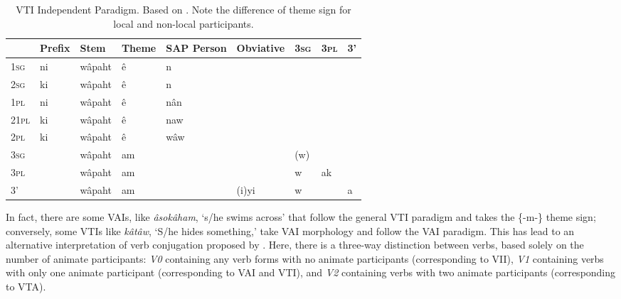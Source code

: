 \begin{table}[h]
  \centering
\begin{tabular}{lllllllll}
    \toprule
     & Prefix & Stem   & Theme & SAP Person & Obviative & 3\textsc{sg} & 3\textsc{pl} & 3' \\
    \midrule
1\textsc{sg}    & ni     & wâpaht & ê     & n          &           &            &            &    \\
2\textsc{sg}    & ki     & wâpaht & ê     & n          &           &            &            &    \\
1\textsc{pl}  & ni     & wâpaht & ê     & nân        &           &            &            &    \\
21\textsc{pl} & ki     & wâpaht & ê     & naw        &           &            &            &    \\
2\textsc{pl}  & ki     & wâpaht & ê     & wâw        &           &            &            &    \\
3\textsc{sg}    &        & wâpaht & am    &            &           & (w)        &            &    \\
3\textsc{pl}  &        & wâpaht & am    &            &           & w          & ak         &    \\
3'   &        & wâpaht & am    &            & (i)yi       & w          &            & a    \\
    \bottomrule
  \end{tabular}
  \caption{
    VTI Independent Paradigm. Based on \citet[417]{Wolvengrey2011}. Note the difference of theme sign for local and non-local participants. \label{tab:vtiindpara}
  }
\end{table}



In fact, there are some VAIs, like \textit{âsokâham}, `s/he swims across' that follow the general VTI paradigm and takes the \{-m-\} theme sign; conversely, some VTIs like \textit{kâtâw}, `S/he hides something,' take VAI morphology and follow the VAI paradigm. This has lead to an alternative interpretation of verb conjugation proposed by \citet{Wolvengrey2011}. Here, there is a three-way distinction between verbs, based solely on the number of animate participants: \textit{V0} containing any verb forms with no animate participants (corresponding to VII), \textit{V1} containing verbs with only one animate participant (corresponding to VAI and VTI), and \textit{V2} containing verbs with two animate participants (corresponding to VTA).

